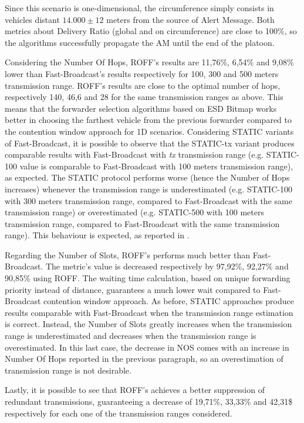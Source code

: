 		Since this scenario is one-dimensional, the circumference simply consists in vehicles distant $14.000  \pm 12$ meters from the source of Alert Message. Both metrics about Delivery Ratio (global and on circumference) are close to 100\%, so the algorithms successfully propagate the AM until the end of the platoon.
		
		
		Considering the Number Of Hops, ROFF's results are 11,76\%, 6,54\% and 9,08\% lower than Fast-Broadcast's results respectively for 100, 300 and 500 meters transmission range. ROFF's results are close to the optimal number of hops, respectively 140, 46,6 and 28 for the same transmission ranges as above. This means that the forwarder selection algorithms based on ESD Bitmap works better in choosing the farthest vehicle from the previous forwarder compared to the contention window approach for 1D scenarios. Considering STATIC variants of Fast-Broadcast, it is possible to observe that the STATIC-tx variant produces comparable results with Fast-Broadcast with \textit{tx} transmission range (e.g. STATIC-100 value is comparable to Fast-Broadcast with 100 meters transmission range), as expected. The STATIC protocol performs worse (hence the Number of Hops increases) whenever the transmission range is underestimated (e.g. STATIC-100 with 300 meters transmission range, compared to Fast-Broadcast with the same transmission range) or overestimated (e.g. STATIC-500 with 100 meters transmission range, compared to Fast-Broadcast with the same transmission range). This behaviour is expected, as reported in \cite{BAR2017}.
		
		
		Regarding the Number of Slots, ROFF's performs much better than Fast-Broadcast. The metric's value is decreased respectively by 97,92\%, 92,27\% and 90,85\%  using ROFF. The waiting time calculation, based on unique forwarding priority instead of distance, guarantees a much lower wait compared to Fast-Broadcast contention window approach. As before, STATIC approaches produce results comparable with Fast-Broadcast when the transmission range estimation is correct. Instead, the Number of Slots greatly increases when the transmission range is underestimated and decreases when the transmission range is overestimated. In this last case, the decrease in NOS comes with an increase in Number Of Hops reported in the previous paragraph, so an overestimation of transmission range is not desirable.
		
		
		Lastly, it is possible to see that ROFF's achieves a better suppression of redundant transmissions, guaranteeing a decrease of 19,71\%, 33,33\% and 42,31\$ respectively for each one of the transmission ranges considered.
		
